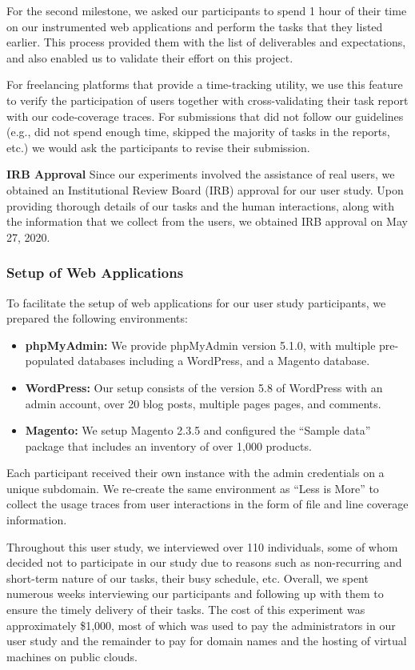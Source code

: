 For the second milestone, we asked our participants to spend 1 hour of their time on our instrumented web applications and perform the tasks that they listed earlier. 
This process provided them with the list of deliverables and expectations, and also enabled us to validate their effort on this project. 

For freelancing platforms that provide a time-tracking utility, we use this feature to verify the participation of users together with cross-validating their task report with our code-coverage traces. 
For submissions that did not follow our guidelines (e.g., did not spend enough time, skipped the majority of tasks in the reports, etc.) we would ask the participants to revise their submission. 

\textbf{IRB Approval} Since our experiments involved the assistance of real users, we obtained an Institutional Review Board (IRB) approval for our user study. 
Upon providing thorough details of our tasks and the human interactions, along with the information that we collect from the users, we obtained IRB approval on May 27, 2020. 

\subsubsection{Setup of Web Applications}

To facilitate the setup of web applications for our user study participants, we prepared the following environments:

\begin{itemize}
    \item \textbf{phpMyAdmin:} We provide phpMyAdmin version 5.1.0, with multiple pre-populated databases including a WordPress, and a Magento database.
    \item \textbf{WordPress:} Our setup consists of the version 5.8 of WordPress with an admin account, over 20 blog posts, multiple pages pages, and comments. 
    \item \textbf{Magento:} We setup Magento 2.3.5 and configured the ``Sample data'' package that includes an inventory of over 1,000 products. 
\end{itemize}

Each participant received their own instance with the admin credentials on a unique subdomain. 
We re-create the same environment as ``Less is More'' to collect the usage traces from user interactions in the form of file and line coverage information. 

Throughout this user study, we interviewed over 110 individuals, some of whom decided not to participate in our study due to reasons such as non-recurring and short-term nature of our tasks, their busy schedule, etc.
Overall, we spent numerous weeks interviewing our participants and following up with them to ensure the timely delivery of their tasks. The cost of this experiment was approximately \$1,000, most of which was used to pay the administrators in our user study and the remainder to pay for domain names and the hosting of virtual machines on public clouds.


